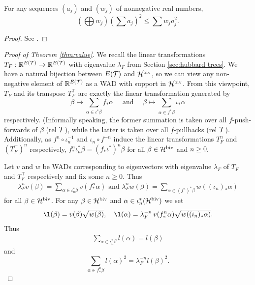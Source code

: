 \begin{lemma}\label{lem:harmonic and geometric sum}
    For any sequences $(a_j)$ and $(w_j)$ of nonnegative real numbers, 
    \begin{equation}\label{eq:harmonic sum bound}
        \left(\bigoplus w_j\right)\left(\sum a_j\right)^2\leq \sum w_ja_j^2. 
    \end{equation}
\end{lemma}
\begin{proof}
    See \cite[Lemma 10.1]{K06}.
\end{proof}


\begin{proof}[Proof of Theorem \ref{thm:value}]
    We recall the linear  transformations $T_F: \mathbb R^{E(\mathcal T)}\to \mathbb R^{E(\mathcal T)}$ with eigenvalue $\lambda_F$ from Section \ref{sec:hubbard trees}. We have a natural bijection between $E(\mathcal T)$ and $\mathcal H^{\mathrm{biv}}$, so we can view any non-negative element of $\mathbb R^{E(\mathcal T)}$ as a WAD with support in $\mathcal H^{\mathrm{biv}}$. From this viewpoint, $T_F$ and its transpose $T_F^\top$ are exactly the linear transformation generated by 
    $$\beta\mapsto \sum_{\alpha\in \iota^*\beta} f_*\alpha \quad \text{ and } \quad \beta\mapsto \sum_{\alpha \in f^*\beta}\iota_*\alpha$$
    respectively.  {(Informally speaking, the former summation is taken over all $f$-push-forwards of $\beta$ (rel $\mathcal T$),
    while the latter is taken over all $f$-pullbacks (rel $\mathcal T$).}
    Additionally, 
    as $f^n\circ \iota_n^{-1}$ and $\iota_n\circ f^{-n}$ induce the linear transformations $T_F^n$ and $(T_F^\top)^n$ respectively, $f^n_*\iota_n^*\beta = (f_*\iota^*)^n\beta$ for all $\beta\in \mathcal H^{\mathrm{biv}}$ and $n\geq 0$.


    Let $v$ and $w$ be WADs corresponding to eigenvectors with eigenvalue $\lambda_F$ of $T_F$ and $T_F^\top$ respectively and fix some $n\geq 0$. Thus 
    \begin{align*}
        \lambda_F^nv(\beta) =\sum_{\alpha\in \iota_n^*\beta}v(f^n_*\alpha) \text{ and }
        \lambda_F^nw(\beta) =\sum_{\alpha\in (f^n)^*\beta}w((\iota_n)_*\alpha)
    \end{align*}
    for all $\beta\in \mathcal H^{\mathrm{biv}}$.
   {For any $\beta\in \mathcal H^{\mathrm{biv}}$ and {$\alpha\in \iota_n^*(\mathcal H^{\mathrm{biv}})$} 
    we set 
    \begin{equation*}
    \l(\beta)= v(\beta)\sqrt{w(\beta)},\quad 
    \l(\alpha) = \lambda_F^{-n} \, v(f_*^n\alpha)\sqrt{w((i_n)_*\alpha)}.
    \end{equation*}} 
    Thus 
\begin{align} \label{eq:basic-length}
	\sum_{\alpha \in \iota_n^*\beta} l(\alpha) = l(\beta)
\end{align}
and 
\begin{equation} \label{eq:basic-value}
	\sum_{{\alpha \in f_*^n \beta}} l(\alpha)^2 = \lambda_F^{-n} l(\beta)^2.
\end{equation}



\end{proof}
